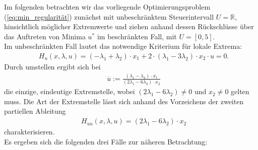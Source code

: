  Im folgenden betrachten wir das vorliegende Optimierungsproblem (\ref{eq:min_regularität}) zunächst mit unbeschränktem Steuerintervall $U = \mathbb{R}$, hinsichtlich möglicher Extremwerte und ziehen anhand dessen Rückschlüsse über das Auftreten von Minima $u^*$ im beschränkten Fall, mit $U=[0,5]$. \\
Im unbeschränkten Fall lautet das notwendige Kriterium für lokale Extrema:
\begin{align}
	&H_u(x,\lambda,u)  =  (-\lambda_1 + \lambda_2) \cdot x_1 + 2 \cdot (\lambda_1 - 3 \lambda_2) \cdot x_2 \cdot u = 0. \label{eq:NotwBedExtrema}
\end{align}
Durch umstellen ergibt sich bei
\begin{align}
	&\overline{u}  :=  \frac{(\lambda_1-\lambda_2) \cdot  x_1}{(2 \lambda_1 -  6 \lambda_2) \cdot  x_2} 
	\label{eq:Extremstelle}
\end{align}
die einzige, eindeutige Extremstelle, wobei $(2 \lambda_1 -  6 \lambda_2) \neq  0$ und $x_2 \neq  0$ gelten muss. Die Art der Extremstelle lässt sich anhand des Vorzeichens der zweiten partiellen Ableitung
\begin{align}
	&H_{uu}(x,\lambda,u)  = (2 \lambda_1 -  6 \lambda_2) \cdot  x_2
\end{align}
charakterisieren. \\
Es ergeben sich die folgenden drei Fälle zur näheren Betrachtung:
